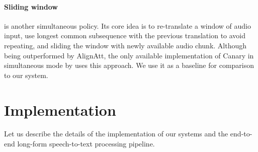 \documentclass[11pt]{article}
\def\XXX#1{\textcolor{red}{XXX #1}}
\begin{document}
\paragraph{Sliding window} \citep{sen2022simultaneous} is another simultaneous policy. Its core idea is to re-translate a window of audio input, use longest common subsequence with the previous translation to avoid repeating, and sliding the window with newly available audio chunk. Although being outperformed by AlignAtt, the only available implementation of Canary in simultaneous mode by \citet{gaido2025simulstream} uses this approach. We use it as a baseline for comparison to our system.













\section{Implementation}
\label{sec:implementation}
Let us describe the details of the implementation of our systems and the end-to-end long-form speech-to-text processing pipeline. %
\end{document}
